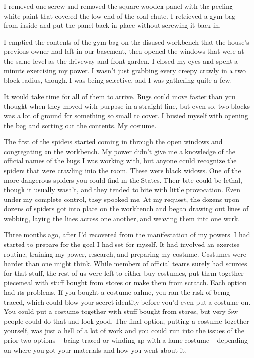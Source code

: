 I removed one screw and removed the square wooden panel with the peeling white paint that covered the low end of the coal chute.  I retrieved a gym bag from inside and put the panel back in place without screwing it back in.



I emptied the contents of the gym bag on the disused workbench that the house's previous owner had left in our basement, then opened the windows that were at the same level as the driveway and front garden.  I closed my eyes and spent a minute exercising my power.  I wasn't just grabbing every creepy crawly in a two block radius, though.  I was being selective, and I was gathering quite a few.



It would take time for all of them to arrive.  Bugs could move faster than you thought when they moved with purpose in a straight line, but even so, two blocks was a lot of ground for something so small to cover.  I busied myself with opening the bag and sorting out the contents.  My costume.



The first of the spiders started coming in through the open windows and congregating on the workbench.  My power didn't give me a knowledge of the official names of the bugs I was working with, but anyone could recognize the spiders that were crawling into the room.  These were black widows.  One of the more dangerous spiders you could find in the States.  Their bite could be lethal, though it usually wasn't, and they tended to bite with little provocation.  Even under my complete control, they spooked me.  At my request, the dozens upon dozens of spiders got into place on the workbench and began drawing out lines of webbing, laying the lines across one another, and weaving them into one work.



Three months ago, after I'd recovered from the manifestation of my powers, I had started to prepare for the goal I had set for myself.  It had involved an exercise routine, training my power, research, and preparing my costume.  Costumes were harder than one might think.  While members of official teams surely had sources for that stuff, the rest of us were left to either buy costumes, put them together piecemeal with stuff bought from stores or make them from scratch.  Each option had its problems.  If you bought a costume online, you ran the risk of being traced, which could blow your secret identity before you'd even put a costume on.  You could put a costume together with stuff bought from stores, but very few people could do that and look good.  The final option, putting a costume together yourself, was just a hell of a lot of work and you could run into the issues of the prior two options – being traced or winding up with a lame costume – depending on where you got your materials and how you went about it.



